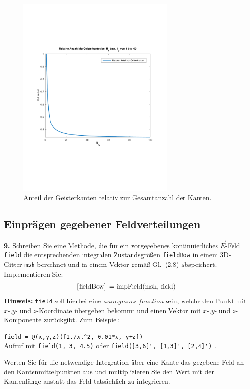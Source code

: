 \documentclass[Protokollheft.tex]{subfiles}
\begin{document}
	\begin{figure}[h]
	\centering
	\includegraphics[trim = 15mm 65mm 15mm 60mm, clip, width=0.7\textwidth]{plotBoundEdg.pdf}
	\caption{Anteil der Geisterkanten relativ zur Gesamtanzahl der Kanten.}
	\label{Abb:boundEdg}
	\end{figure}



{\subsection{Einprägen gegebener Feldverteilungen}}

        \begin{framed}
	\noindent \textbf{9.} Schreiben Sie eine Methode, die für ein
        vorgegebenes kontinuierliches $\vec{E}$-Feld \lstinline{field}
        die entsprechenden integralen Zustandsgrößen \lstinline{fieldBow}
        in einem 3D-Gitter \lstinline{msh} berechnet und in einem Vektor gemäß
        Gl.~(2.8) abspeichert. Implementieren Sie:
        \begin{align}
            \lstinline{[fieldBow] = impField(msh, field)}
        \end{align}
        {\textbf{Hinweis:}} \lstinline{field} soll hierbei eine \emph{anonymous function} sein, welche den Punkt mit $x$-,$y$- und $z$-Koordinate übergeben bekommt und einen Vektor mit $x$-,$y$- und $z$-Komponente zurückgibt. Zum Beispiel:
        \begin{center}
            \lstinline{field = @(x,y,z)([1./x.^2, 0.01*x, y+z])}\\
            Aufruf mit \lstinline{field(1, 3, 4.5)} oder \lstinline{field([3,6]', [1,3]', [2,4]')} \; .
        \end{center}
        Werten Sie für die notwendige Integration über eine Kante das gegebene Feld an den Kantenmittelpunkten aus und multiplizieren Sie den Wert mit
        der Kantenlänge anstatt das Feld tatsächlich zu integrieren.\label{exer:impField}
\end{framed}
\end{document}
